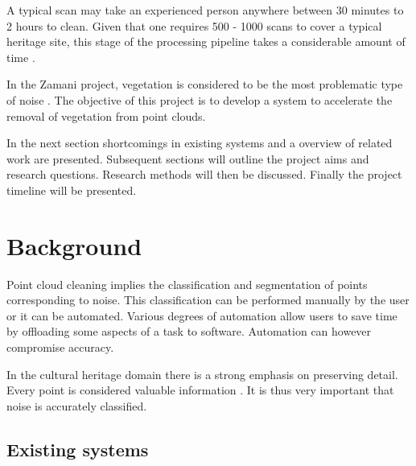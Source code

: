 \documentclass[10pt,twocolumn]{article}
\begin{document}
A typical scan may take an experienced person anywhere between 30 minutes to 2 hours to clean. Given that one requires 500 - 1000 scans to cover a typical heritage site, this stage of the processing pipeline takes a considerable amount of time \cite{Ruther2011}.

In the Zamani project, vegetation is considered to be the most problematic type of noise \cite{Held2012}. The objective of this project is to develop a system to accelerate the removal of vegetation from point clouds.

In the next section shortcomings in existing systems and a overview of related work are presented. Subsequent sections will outline the project aims and research questions. Research methods will then be discussed. Finally the project timeline will be presented.

\section{Background}

Point cloud cleaning implies the classification and segmentation of points corresponding to noise. This classification can be performed manually by the user or it can be automated. Various degrees of automation allow users to save time by offloading some aspects of a task to software. Automation can however compromise accuracy.

In the cultural heritage domain there is a strong emphasis on preserving detail. Every point is considered valuable information \cite{Held2012}. It is thus very important that noise is accurately classified.

\subsection{Existing systems}
\end{document}
